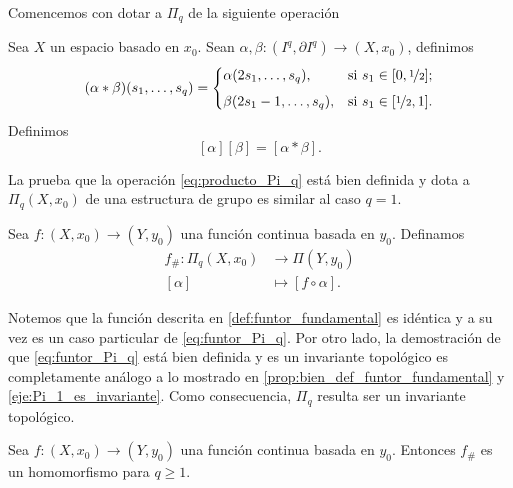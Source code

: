     Comencemos con dotar a $\Pi_q$ de la siguiente operación
    \begin{definicion}
        Sea $X$ un espacio basado en $x_0$. Sean $\alpha,\beta:(I^q,\partial I^q)\to(X,x_0)$, definimos
        \begin{equation*}
            (\alpha*\beta)(s_1,\ldots,s_q) = 
            \begin{cases} 
                \alpha(2s_1,\ldots,s_q), & \text{si } s_1\in[0,\nicefrac{1}{2}]; \\[1ex]
                \beta(2s_1-1,\ldots,s_q), & \text{si } s_1\in [\nicefrac{1}{2},1]. 
            \end{cases}
        \end{equation*}
        Definimos 
        \begin{equation}
        \label{eq:producto_Pi_q}
            [\alpha][\beta]=[\alpha*\beta].
        \end{equation}
    \end{definicion}
La prueba que la operación \ref{eq:producto_Pi_q} está bien definida y dota a $\Pi_q(X,x_0)$ de una estructura de grupo es similar al caso $q=1$.
\begin{definicion}
    Sea $f:(X,x_0)\to(Y,y_0)$ una función continua basada en $y_0$. Definamos
    \begin{equation}
    \label{eq:funtor_Pi_q}
        \begin{split}
            f_\#:\Pi_q(X,x_0)&\to\Pi(Y,y_0)\\
        [\alpha]&\mapsto [f\circ\alpha].
        \end{split}
    \end{equation}
\end{definicion}
\begin{obs}
\label{obs:funtor_Pi_q}
    Notemos que la función descrita en \ref{def:funtor_fundamental} es idéntica y a su vez es un caso particular de \ref{eq:funtor_Pi_q}. Por otro lado, la demostración de que \ref{eq:funtor_Pi_q} está bien definida y es un invariante topológico es completamente análogo a lo mostrado en \ref{prop:bien_def_funtor_fundamental} y \ref{eje:Pi_1_es_invariante}. Como consecuencia, $\Pi_q$ resulta ser un invariante topológico.
\end{obs}
\begin{lema}
    Sea $f:(X,x_0)\to(Y,y_0)$ una función continua basada en $y_0$. Entonces $f_\#$ es un homomorfismo para $q\geq 1.$
\end{lema}
